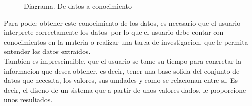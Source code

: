 \begin{figure}[h]
    \centering 
      \caption{Diagrama. De datos a conocimiento}
    \end{figure}
 
Para poder obtener este conocimiento de los datos, es necesario que el usuario interprete correctamente los datos, por lo
que el usuario debe contar con conocimientos en la materia o realizar una tarea de investigacion, que le permita 
entender los datos extraidos. \\
    
    
Tambien es imprescindible, que el usuario se tome su tiempo para concretar la informacion que desea
obtener, es decir, tener una base solida del conjunto de datos que necesita, los valores,
sus unidades y como se relacionan entre si. Es decir, el diseno de un sistema que a partir de unos valores dados,
le proporcione unos resultados.\\
    

